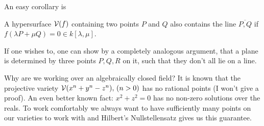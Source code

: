 An easy corollary is
\begin{lemma} \label{lemmaLineOnSurface}
A hypersurface $\operatorname{\mathcal V}(f)$ containing two points $P$ and $Q$ also contains the line $\overline{P,Q}$ if $f(\lambda P +\mu Q) = 0 \in k[\lambda,\mu]$.
\end{lemma}

If one wishes to, one can show by a completely analogous argument, that a plane is determined by three points $P,Q,R$ on it, such that they don't all lie on a line.

\begin{remark}
Why are we working over an algebraically closed field?
It is known that the projective variety $\operatorname{\mathcal V}(x^n + y^n - z^n), \,(n>0)$ has no rational points (I won't give a proof).
An even better known fact: $x^2 + z^2 = 0$ has no non-zero solutions over the reals.
To work comfortably we always want to have sufficiently many points on our varieties to work with and Hilbert's Nullstellensatz gives us this guarantee.
\end{remark}
